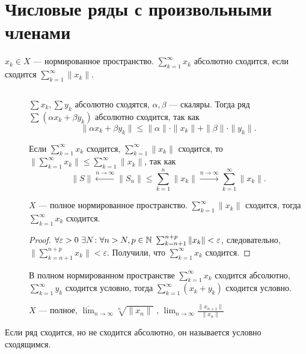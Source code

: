 \section{Числовые ряды с произвольными членами}
\begin{defn}
    $ x_k \in  X$ --- нормированное пространство. $ \sum_{k=1}^{\infty} x_k$ {\sf абсолютно сходится}, если сходится $ \sum_{k=1}^{\infty} \| x_k \| $.
\end{defn}
\begin{prop}

    $ $
    \begin{description}
	\item[] $ \sum x_k, \sum y_k $ абсолютно сходятся,  $ \alpha , \beta $ --- скаляры. Тогда ряд $ \sum_{}^{} ( \alpha x_k + \beta y_k)$ абсолютно сходится, так как
	    \[
	    \|  \alpha x_k + \beta  y_k \|  \le \| \alpha  \| \cdot \|  x_k \|  + \| \beta  \| \cdot  \|  y_k \| 
	    .\] 
	\item[] Если $ \sum_{k=1}^{\infty} x_k$ сходится, $ \sum_{k=1}^{\infty} \| x_k \| $ сходится, то $ \| \sum_{k=1}^{\infty}  x_k\| \le \sum_{k=1}^{\infty} \| x_k \| $, так как
	    \[
		\| S \| \stackrel{n \to  \infty}{\longleftarrow} \| S_n \| \le \sum_{k=1}^{n} \|  x_k \|  \stackrel{n \to  \infty}{\longrightarrow} \sum_{k=1}^{\infty} \| x_k \| 
	    .\] 
	\item[] $ X$ --- полное нормированное пространство. $ \sum_{k=1}^{\infty} \| x_k \|   $ сходится, тогда $ \sum_{k=1}^{\infty} x_k$ сходится.
	    \begin{proof}
		    $ \forall  \varepsilon >0 ~ \exists  N \colon  \forall n > N , p \in  \mathbb{N} ~ \sum_{k = n+1}^{n+p} \| x_k \|  < \varepsilon $, следовательно, $ \| \sum_{k = n+1}^{n+p} x_k \| < \varepsilon $. Получили, что $ \sum_{k=1}^{\infty} x_k$ сходится.
	    \end{proof}
	\item[] В полном нормированном пространстве $ \sum_{k=1}^{\infty} x_k$ сходится абсолютно, $ \sum_{k=1}^{\infty} y_k$ сходится условно, тогда $ \sum_{k=1}^{\infty} (x_k+ y_k)$ сходится условно.
	\item[] $ X $ --- полное, $ \overline{\lim}_{n \to  \infty} \sqrt[n]{ \|  x_n \| } $ , $ \lim_{n \to \infty} \frac{\| x_{n+1} \| }{\| x_n \| }$

    \end{description}
\end{prop}
\begin{defn}
    Если ряд сходится, но не сходится абсолютно, он называется {\sf условно сходящимся.}  
\end{defn}
